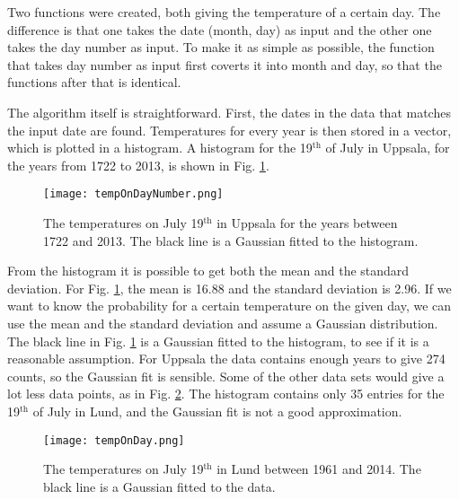 


Two functions were created, both giving the temperature of a certain day. The difference is that one takes the date (month, day) as input and the other one takes the day number as input. To make it as simple as possible, the function that takes day number as input first coverts it into month and day, so that the functions after that is identical. 

The algorithm itself is straightforward. First, the dates in the data that matches the input date are found. Temperatures for every year is then stored in a vector, which is plotted in a histogram. A histogram for the 19$^{\text{th}}$ of July in Uppsala, for the years from 1722 to 2013, is shown in Fig. \ref{fig:tempOnDayNumber}.

\begin{figure}[ht]
\begin{center}
\texttt{[image: tempOnDayNumber.png]}
\caption{\label{fig:tempOnDayNumber} The temperatures on July 19$^{\text{th}}$ in Uppsala for the years between 1722 and 2013. The black line is a Gaussian fitted to the histogram.}
\end{center}
\end{figure}

From the histogram it is possible to get both the mean and the standard deviation. For Fig. \ref{fig:tempOnDayNumber}, the mean is 16.88 and the standard deviation is 2.96. If we want to know the probability for a certain temperature on the given day, we can use the mean and the standard deviation and assume a Gaussian distribution. The black line in Fig. \ref{fig:tempOnDayNumber} is a Gaussian fitted to the histogram, to see if it is a reasonable assumption. For Uppsala the data contains enough years to give 274 counts, so the Gaussian fit is sensible. Some of the other data sets would give a lot less data points, as in Fig. \ref{fig:tempOnDay}. The histogram contains only 35 entries for the 19$^{\text{th}}$ of July in Lund, and the Gaussian fit is not a good approximation. 

\begin{figure}[ht]
\begin{center}
\texttt{[image: tempOnDay.png]}
\caption{\label{fig:tempOnDay} The temperatures on July 19$^{\text{th}}$ in Lund between 1961 and 2014. The black line is a Gaussian fitted to the data.}
\end{center}
\end{figure}

\begin{comment}
\begin{figure}[ht]
\centering
\subfloat[Uppsala]{\label{fig:tempOnDayNumber2}\texttt{[image: tempOnDayNumber.png]}} 
\subfloat[Lund]{\label{fig:tempOnDay2}\texttt{[image: tempOnDay.png]}}\\
\caption{The temperatures on July 19$^{th}$ in Uppsala for the years between 1722 and 2013 in (a). The black line is a Gaussian fitted to the histogram.}
\label{fig:spring}
\end{figure}
\end{comment}


